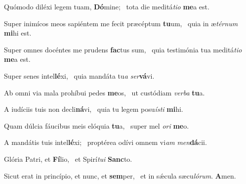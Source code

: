 \item Quómodo diléxi legem tuam, \textbf{Dó}mine;~\psstar{} tota die meditá\textit{tio} \textbf{me}a est.

\item Super inimícos meos sapiéntem me fecit præcéptum \textbf{tu}um,~\psstar{} quia in æ\textit{térnum} \textbf{mi}hi est.

\item Super omnes docéntes me prudens \textbf{fac}tus sum,~\psstar{} quia testimónia tua meditá\textit{tio} \textbf{me}a est.

\item Super senes intel\textbf{lé}xi,~\psstar{} quia mandáta tu\textit{a} \textit{ser}\textbf{vá}vi.

\item Ab omni via mala prohíbui pedes \textbf{me}os,~\psstar{} ut custódiam \textit{verba} \textbf{tu}a.

\item A iudíciis tuis non decli\textbf{ná}vi,~\psstar{} quia tu legem posu\textit{ísti} \textbf{mi}hi.

\item Quam dúlcia fáucibus meis elóquia \textbf{tu}a,~\psstar{} super mel \textit{ori} \textbf{me}o.

\item A mandátis tuis intel\textbf{lé}xi;~\psstar{} proptérea odívi omnem vi\textit{am} \textit{men}\textbf{dá}cii.

\item Glória Patri, et \textbf{Fí}lio,~\psstar{} et Spirí\textit{tui} \textbf{Sanc}to.

\item Sicut erat in princípio, et nunc, et \textbf{sem}per,~\psstar{} et in sǽcula sæcu\textit{lórum}. \textbf{A}men.
